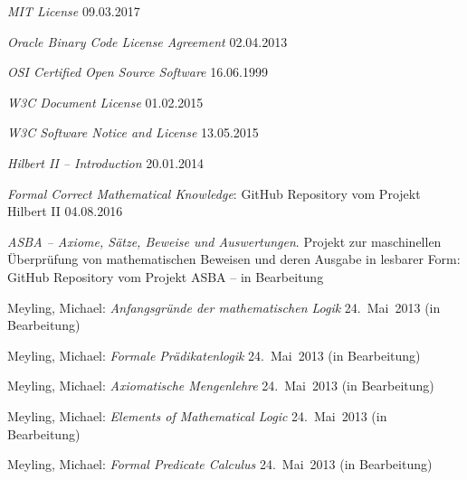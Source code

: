 \begin{flushleft}
\begin{thebibliography}{12}
		\emph{MIT License}
		09.03.2017

		\emph{Oracle Binary Code License Agreement}
		02.04.2013

		\emph{OSI Certified Open Source Software}
		16.06.1999

		\emph{W3C Document License}
		01.02.2015

		\emph{W3C Software Notice and License}
		13.05.2015

		\emph{Hilbert II -- Introduction}
		20.01.2014

		\emph{Formal Correct Mathematical Knowledge}:
		GitHub Repository vom Projekt Hilbert II
		04.08.2016

		\emph{ASBA
			-- Axiome, Sätze, Beweise und Auswertungen}.
		Projekt zur maschinellen Überprüfung von mathematischen Beweisen
		und deren Ausgabe in lesbarer Form:
		GitHub Repository vom Projekt ASBA
		-- in Bearbeitung

		Meyling, Michael:
		\emph{Anfangsgründe der mathematischen Logik}
		24.~Mai~2013 (in Bearbeitung)

		Meyling, Michael:
		\emph{Formale Prädikatenlogik}
		24.~Mai~2013 (in Bearbeitung)

		Meyling, Michael:
		\emph{Axiomatische Mengenlehre}
		24.~Mai~2013 (in Bearbeitung)

		Meyling, Michael:
		\emph{Elements of Mathematical Logic}
		24.~Mai~2013 (in Bearbeitung)

		Meyling, Michael:
		\emph{Formal Predicate Calculus}
		24.~Mai~2013 (in Bearbeitung)


\end{thebibliography}
\end{flushleft}
